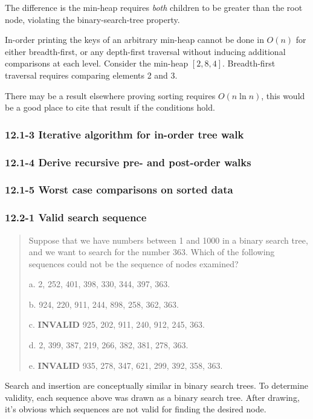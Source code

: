 \documentclass{article}
\begin{document}
The difference is the min-heap requires \emph{both} children to be
greater than the root node, violating the binary-search-tree property.

In-order printing the keys of an arbitrary min-heap cannot be done in $O(n)$
for either breadth-first, or any depth-first traversal without inducing
additional comparisons at each level. Consider the min-heap $[2, 8, 4]$.
Breadth-first traversal requires comparing elements 2 and 3.

There may be a result elsewhere proving sorting requires $O(n\ln n)$,
this would be a good place to cite that result if the conditions hold.

\subsubsection{12.1-3 Iterative algorithm for in-order tree walk}

\subsubsection{12.1-4 Derive recursive pre- and post-order walks}

\subsubsection{12.1-5 Worst case comparisons on sorted data}

\subsubsection{12.2-1 Valid search sequence}

\begin{quote}
Suppose that we have numbers between 1 and 1000 in a binary search tree, and we
want to search for the number 363. Which of the following sequences could not be
the sequence of nodes examined?

a. 2, 252, 401, 398, 330, 344, 397, 363.

b. 924, 220, 911, 244, 898, 258, 362, 363.

c. \textbf{INVALID} 925, 202, 911, 240, 912, 245, 363.

d. 2, 399, 387, 219, 266, 382, 381, 278, 363.

e. \textbf{INVALID} 935, 278, 347, 621, 299, 392, 358, 363.
\end{quote}

Search and insertion are conceptually similar in binary search
trees. To determine validity, each sequence above was drawn as
a binary search tree. After drawing, it's obvious which sequences
are not valid for finding the desired node.
\end{document}

